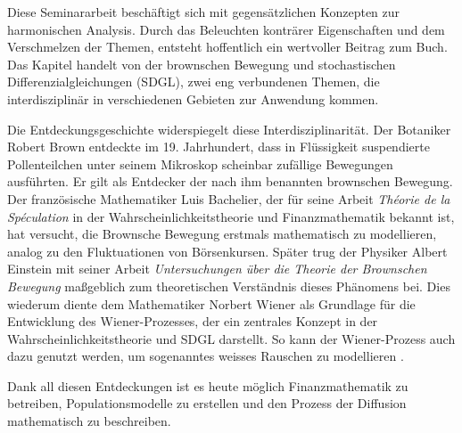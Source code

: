 %
%
%
%

Diese Seminararbeit beschäftigt sich mit gegensätzlichen Konzepten zur harmonischen Analysis. Durch das Beleuchten konträrer Eigenschaften und dem Verschmelzen der Themen, entsteht hoffentlich ein wertvoller Beitrag zum Buch. Das Kapitel handelt von der brownschen Bewegung und stochastischen Differenzialgleichungen (SDGL), zwei eng verbundenen Themen, die interdisziplinär in verschiedenen Gebieten zur Anwendung kommen.

Die Entdeckungsgeschichte widerspiegelt diese Interdisziplinarität. Der Botaniker Robert Brown entdeckte im 19. Jahrhundert, dass in Flüssigkeit suspendierte Pollenteilchen unter seinem Mikroskop scheinbar zufällige Bewegungen ausführten. Er gilt als Entdecker der nach ihm benannten brownschen Bewegung. Der französische Mathematiker Luis Bachelier, der für seine Arbeit \textit{Théorie de la Spéculation} \cite{bachelier1900théorie} in der Wahrscheinlichkeitstheorie und Finanzmathematik bekannt ist, hat versucht, die Brownsche Bewegung erstmals mathematisch zu modellieren, analog zu den Fluktuationen von Börsenkursen. Später trug der Physiker Albert Einstein mit seiner Arbeit \textit{Untersuchungen über die Theorie der Brownschen Bewegung} \cite{einstein1922untersuchungen} maßgeblich zum theoretischen Verständnis dieses Phänomens bei. Dies wiederum diente dem Mathematiker Norbert Wiener als Grundlage für die Entwicklung des Wiener-Prozesses, der ein zentrales Konzept in der Wahrscheinlichkeitstheorie und SDGL darstellt. So kann der Wiener-Prozess auch dazu genutzt werden, um sogenanntes weisses Rauschen zu modellieren .

Dank all diesen Entdeckungen ist es heute möglich Finanzmathematik zu betreiben, Populationsmodelle zu erstellen und den Prozess der Diffusion mathematisch zu beschreiben. %